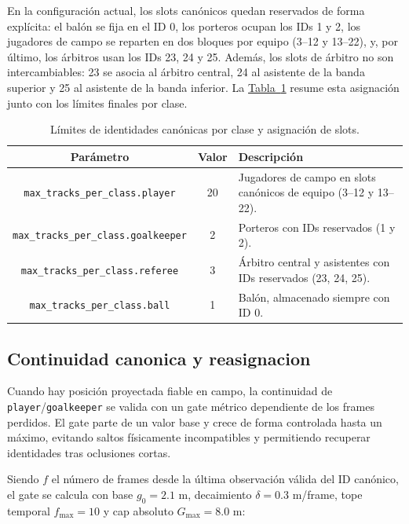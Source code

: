 En la configuración actual, los slots canónicos quedan reservados de forma explícita: el balón se fija en el ID 0, los porteros ocupan los IDs 1 y 2, los jugadores de campo se reparten en dos bloques por equipo (3--12 y 13--22), y, por último, los árbitros usan los IDs 23, 24 y 25. Además, los slots de árbitro no son intercambiables: 23 se asocia al árbitro central, 24 al asistente de la banda superior y 25 al asistente de la banda inferior. La \hyperref[tab:limites-canonicos]{Tabla~\ref*{tab:limites-canonicos}} resume esta asignación junto con los límites finales por clase.

\begin{table}[htbp]
    \centering
    \scriptsize
    \begin{tabular}{c|c|p{7.5cm}}
        \textbf{Parámetro} & \textbf{Valor} & \textbf{Descripción} \\
        \hline\hline
        \texttt{max\_tracks\_per\_class.player} & 20 & Jugadores de campo en slots canónicos de equipo (3--12 y 13--22). \\
        \texttt{max\_tracks\_per\_class.goalkeeper} & 2 & Porteros con IDs reservados (1 y 2). \\
        \texttt{max\_tracks\_per\_class.referee} & 3 & Árbitro central y asistentes con IDs reservados (23, 24, 25). \\
        \texttt{max\_tracks\_per\_class.ball} & 1 & Balón, almacenado siempre con ID 0. \\
        \hline
    \end{tabular}
    \caption{Límites de identidades canónicas por clase y asignación de slots.}
    \label{tab:limites-canonicos}
\end{table}


\subsection{Continuidad canonica y reasignacion}
\label{subsec:continuidad-canonica-reasignacion}

Cuando hay posición proyectada fiable en campo, la continuidad de \texttt{player}/\texttt{goalkeeper} se valida con un gate métrico dependiente de los frames perdidos. El gate parte de un valor base y crece de forma controlada hasta un máximo, evitando saltos físicamente incompatibles y permitiendo recuperar identidades tras oclusiones cortas.

Siendo \(f\) el número de frames desde la última observación válida del ID canónico, el gate se calcula con base \(g_0=2.1\) m, decaimiento \(\delta=0.3\) m/frame, tope temporal \(f_{\max}=10\) y cap absoluto \(G_{\max}=8.0\) m:

